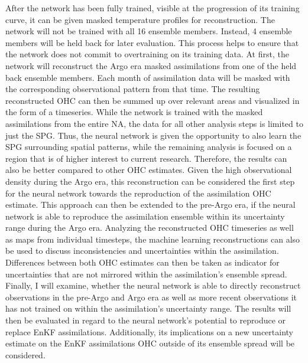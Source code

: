 \documentclass[Masterarbeit.tex]{subfile}
\begin{document}
	 After the network has been fully trained, visible at the progression of its training curve, it can be given masked temperature profiles for reconstruction. The network will not be trained with all 16 ensemble members. Instead, 4 ensemble members will be held back for later evaluation. This process helps to ensure that the network does not commit to overtraining on its training data. At first, the network will reconstruct the Argo era masked assimilations from one of the held back ensemble members. Each month of assimilation data will be masked with the corresponding observational pattern from that time. The resulting reconstructed OHC can then be summed up over relevant areas and visualized in the form of a timeseries. While the network is trained with the masked assimilations from the entire NA, the data for all other analysis steps is limited to just the SPG. Thus, the neural network is given the opportunity to also learn the SPG surrounding spatial patterns, while the remaining analysis is focused on a region that is of higher interest to current research. Therefore, the results can also be better compared to other OHC estimates. Given the high observational density during the Argo era, this reconstruction can be considered the first step for the neural network towards the reproduction of the assimilation OHC estimate. This approach can then be extended to the pre-Argo era, if the neural network is able to reproduce the assimilation ensemble within its uncertainty range during the Argo era. Analyzing the reconstructed OHC timeseries as well as maps from individual timesteps, the machine learning reconstructions can also be used to discuss inconsistencies and uncertainties within the assimilation. Differences between both OHC estimates can then be taken as indicator for uncertainties that are not mirrored within the assimilation's ensemble spread. Finally, I will examine, whether the neural network is able to directly reconstruct observations in the pre-Argo and Argo era as well as more recent observations it has not trained on within the assimilation's uncertainty range. The results will then be evaluated in regard to the neural network's potential to reproduce or replace EnKF assimilations. Additionally, its implications on a new uncertainty estimate on the EnKF assimilations OHC outside of its ensemble spread will be considered. 

	
	
	
\end{document}
